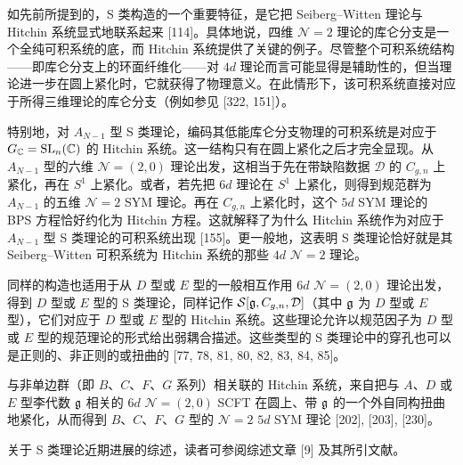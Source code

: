 如先前所提到的，S 类构造的一个重要特征，是它把 Seiberg–Witten 理论与 Hitchin 系统显式地联系起来 [114]。具体地说，四维 $\mathcal{N}=2$ 理论的库仑分支是一个全纯可积系统的底，而 Hitchin 系统提供了关键的例子。尽管整个可积系统结构——即库仑分支上的环面纤维化——对 $4d$ 理论而言可能显得是辅助性的，但当理论进一步在圆上紧化时，它就获得了物理意义。在此情形下，该可积系统直接对应于所得三维理论的库仑分支（例如参见 [322, 151]）。

特别地，对 $A_{N-1}$ 型 S 类理论，编码其低能库仑分支物理的可积系统是对应于 $G_{\mathbb{C}}=\operatorname{SL}_n(\mathbb{C})$ 的 Hitchin 系统。这一结构只有在圆上紧化之后才完全显现。从 $A_{N-1}$ 型的六维 $\mathcal{N}=(2,0)$ 理论出发，这相当于先在带缺陷数据 $\mathcal{D}$ 的 $C_{g,n}$ 上紧化，再在 $S^1$ 上紧化。或者，若先把 $6d$ 理论在 $S^1$ 上紧化，则得到规范群为 $A_{N-1}$ 的五维 $\mathcal{N}=2$ SYM 理论。再在 $C_{g,n}$ 上紧化时，这个 $5d$ SYM 理论的 BPS 方程恰好约化为 Hitchin 方程。这就解释了为什么 Hitchin 系统作为对应于 $A_{N-1}$ 型 S 类理论的可积系统出现 [155]。更一般地，这表明 S 类理论恰好就是其 Seiberg–Witten 可积系统为 Hitchin 系统的那些 $4d$ $\mathcal{N}=2$ 理论。

同样的构造也适用于从 $D$ 型或 $E$ 型的一般相互作用 $6d$ $\mathcal{N}=(2,0)$ 理论出发，得到 $D$ 型或 $E$ 型的 S 类理论，同样记作 $\mathcal{S}[\mathfrak{g},C_{g,n},\mathcal{D}]$（其中 $\mathfrak{g}$ 为 $D$ 型或 $E$ 型），它们对应于 $D$ 型或 $E$ 型的 Hitchin 系统。这些理论允许以规范因子为 $D$ 型或 $E$ 型的规范理论的形式给出弱耦合描述。这些类型的 S 类理论中的穿孔也可以是正则的、非正则的或扭曲的 [77, 78, 81, 80, 82, 83, 84, 85]。

与非单边群（即 $B$、$C$、$F$、$G$ 系列）相关联的 Hitchin 系统，来自把与 $A$、$D$ 或 $E$ 型李代数 $\mathfrak{g}$ 相关的 $6d$ $\mathcal{N}=(2,0)$ SCFT 在圆上、带 $\mathfrak{g}$ 的一个外自同构扭曲地紧化，从而得到 $B$、$C$、$F$、$G$ 型的 $\mathcal{N}=2$ $5d$ SYM 理论 [202], [203], [230]。

关于 S 类理论近期进展的综述，读者可参阅综述文章 [9] 及其所引文献。




